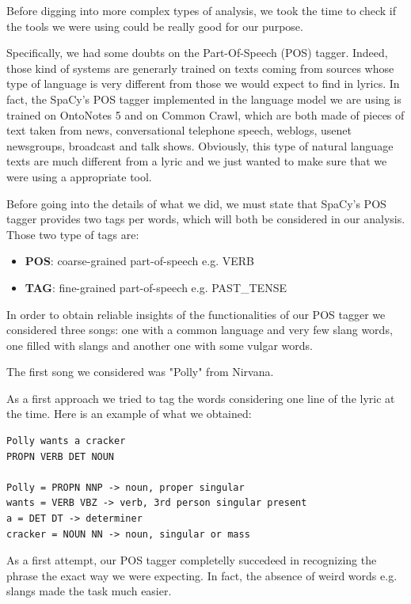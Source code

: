 Before digging into more complex types of analysis, we took the time to check if
the tools we were using could be really good for our purpose. 

Specifically, we had some doubts on the Part-Of-Speech (POS) tagger. Indeed, those kind of systems are generarly 
trained on texts coming from sources whose type of language is very different from those
we would expect to find in lyrics. In fact, the SpaCy's POS tagger implemented in the language
model we are using is trained on OntoNotes 5\cite{ontonotes5} and on Common Crawl\cite{common-crawl},
which are both made of pieces of text taken from news, conversational telephone speech, weblogs, 
usenet newsgroups, broadcast and talk shows. Obviously, this type of natural language texts are 
much different from a lyric and we just wanted to make sure that we were using a appropriate tool.

Before going into the details of what we did, we must state that SpaCy's POS tagger provides two tags per words, which
will both be considered in our analysis. Those two type of tags are:

\begin{itemize}
\item \textbf{POS}: coarse-grained part-of-speech e.g. VERB
\item \textbf{TAG}: fine-grained part-of-speech e.g. PAST\_TENSE
\end{itemize}

In order to obtain reliable insights of the functionalities of our POS tagger we considered three songs:
one with a common language and very few slang words, one filled with slangs and another one with some
vulgar words.

The first song we considered was "Polly" from Nirvana.

As a first approach we tried to tag the words considering one line of the lyric at the time. Here is an example of
what we obtained:

\begin{lstlisting}
Polly wants a cracker
PROPN VERB DET NOUN 

Polly = PROPN NNP -> noun, proper singular
wants = VERB VBZ -> verb, 3rd person singular present
a = DET DT -> determiner
cracker = NOUN NN -> noun, singular or mass
\end{lstlisting}

As a first attempt, our POS tagger completelly succedeed in recognizing the phrase the 
exact way we were expecting. In fact, the absence of weird words e.g. slangs made the
task much easier.

